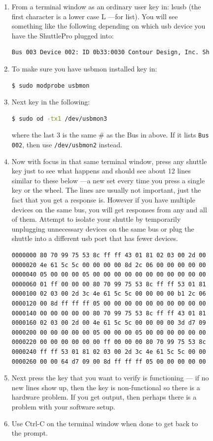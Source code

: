 \begin{figure}
\begin{enumerate}
    \item From a terminal window as an ordinary user key in:  lsusb  (the first character is a lower case L ---for
    list).  You will see something like the following depending on which usb device you have the
    ShuttlePro plugged into:
\begin{lstlisting}[language=Bash]
Bus 003 Device 002: ID 0b33:0030 Contour Design, Inc. ShuttlePro v2
\end{lstlisting}
    \item To make sure you have usbmon installed key in:
\begin{lstlisting}[language=Bash]
$ sudo modprobe usbmon
\end{lstlisting}
    \item Next key in the following:
\begin{lstlisting}[language=Bash]
$ sudo od -tx1 /dev/usbmon3
\end{lstlisting}
    where the last 3 is the same \# as the Bus in above.  If it lists \texttt{Bus 002}, then use \texttt{/dev/usbmon2} instead.
    \item Now with focus in that same terminal window, press any shuttle key just to see what happens and
    should see about 12 lines similar to these below ---a new set every time you press a single key or the
    wheel.  The lines are usually not important, just the fact that you get a response is.  However if you
    have multiple devices on the same bus, you will get responses from any and all of them.  Attempt to
    isolate your shuttle by temporarily unplugging unnecessary devices on the same bus or plug the 
    shuttle into a different usb port that has fewer devices.
    \begin{lstlisting}[language=Bash]
0000000 80 70 99 75 53 8c ff ff 43 01 81 02 03 00 2d 00 
0000020 4e 61 5c 5c 00 00 00 00 8d 2c 06 00 00 00 00 00 
0000040 05 00 00 00 05 00 00 00 00 00 00 00 00 00 00 00 
0000060 01 ff 00 00 00 80 70 99 75 53 8c ff ff 53 01 81 
0000100 02 03 00 2d 3c 4e 61 5c 5c 00 00 00 00 b1 2c 06 
0000120 00 8d ff ff ff 05 00 00 00 00 00 00 00 00 00 00 
0000140 00 00 00 00 00 80 70 99 75 53 8c ff ff 43 01 81 
0000160 02 03 00 2d 00 4e 61 5c 5c 00 00 00 00 3d d7 09 
0000200 00 00 00 00 00 05 00 00 00 05 00 00 00 00 00 00 
0000220 00 00 00 00 00 00 ff 00 00 00 80 70 99 75 53 8c 
0000240 ff ff 53 01 81 02 03 00 2d 3c 4e 61 5c 5c 00 00 
0000260 00 00 64 d7 09 00 8d ff ff ff 05 00 00 00 00 00
    \end{lstlisting}
    \item Next press the key that you want to verify is functioning --- if no new lines show up, then the key is
    non-functional so there is a hardware problem.  If you get output, then perhaps there is a problem
    with your software setup.
    \item Use Ctrl-C on the terminal window when done to get back to the prompt.
\end{enumerate}

\end{figure}
